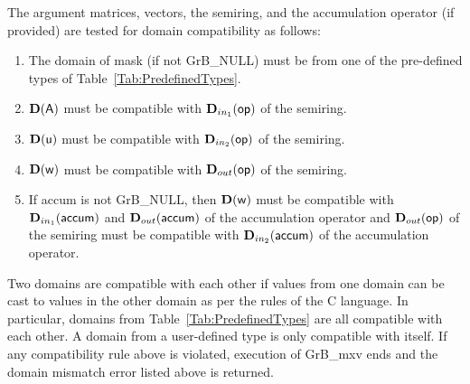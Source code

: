 The argument matrices, vectors, the semiring, and the accumulation operator (if provided) 
are tested for domain compatibility as follows:
\begin{enumerate}
	\item The domain of {\sf mask} (if not {\sf GrB\_NULL}) must be from one of the pre-defined types of Table~\ref{Tab:PredefinedTypes}.

	\item $\bold{D}({\sf A})$ must be compatible with $\mbox{$\mathbf{D}_{in_{1}}$}({\sf op})$ of the semiring.

	\item $\bold{D}({\sf u})$ must be compatible with $\mbox{$\mathbf{D}_{in_{2}}$}({\sf op})$ of the semiring.

	\item $\bold{D}({\sf w})$ must be compatible with $\mbox{$\mathbf{D}_{out}$}({\sf op})$ of the semiring.

	\item If {\sf accum} is not {\sf GrB\_NULL}, then $\bold{D}({\sf w})$ must be compatible with $\mbox{$\mathbf{D}_{in_{1}}$}({\sf accum})$ and $\mbox{$\mathbf{D}_{out}$}({\sf accum})$ of the 
	accumulation operator and $\mbox{$\mathbf{D}_{out}$}({\sf op})$ of the semiring must be compatible with $\mbox{$\mathbf{D}_{in_{2}}$}({\sf accum})$ of the accumulation operator.
\end{enumerate}
Two domains are compatible with each other if values from one domain can be cast 
to values in the other domain as per the rules of the C language.
In particular, domains from Table~\ref{Tab:PredefinedTypes} are all compatible 
with each other. A domain from a user-defined type is only compatible with itself.
If any compatibility rule above is violated, execution of {\sf GrB\_mxv} ends and 
the domain mismatch error listed above is returned.

